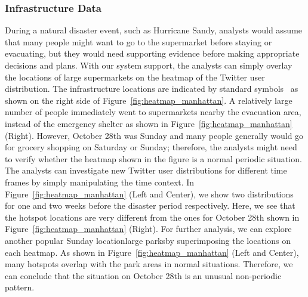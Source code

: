 \subsubsection{Infrastructure Data}
\label{sec:infrastructure_data}
%
During a natural disaster event, such as Hurricane Sandy, analysts would assume that many people might want to go to the supermarket before staying or evacuating, but they would need supporting evidence before making appropriate decisions and plans.
With our system support, the analysts can simply overlay the locations of large supermarkets on the heatmap of the Twitter user distribution.
The infrastructure locations are indicated by standard symbols~\cite{Robinson:2012:DMS} as 
shown on the right side of Figure~\ref{fig:heatmap_manhattan}.
A relatively large number of people immediately went to supermarkets nearby the evacuation area, instead of the emergency shelter as shown in Figure~\ref{fig:heatmap_manhattan} (Right).
However, October 28th was Sunday and many people generally would go for grocery shopping on Saturday or Sunday; therefore, the analysts might need to verify whether the heatmap shown in the figure is a normal periodic situation.
The analysts can investigate new Twitter user distributions for different time frames by simply manipulating the time context.
In Figure~\ref{fig:heatmap_manhattan} (Left and Center), we show two distributions for one and two weeks before the disaster period respectively.
Here, we see that the hotspot locations are very different from the ones for October 28th shown in Figure~\ref{fig:heatmap_manhattan} (Right).
For further analysis, we can explore another popular Sunday location\textemdash large parks\textemdash by superimposing the locations on each heatmap.
As shown in Figure~\ref{fig:heatmap_manhattan} (Left and Center), many hotspots overlap with the park areas in normal situations.
Therefore, we can conclude that the situation on October 28th is an unusual non-periodic pattern.
%
%



